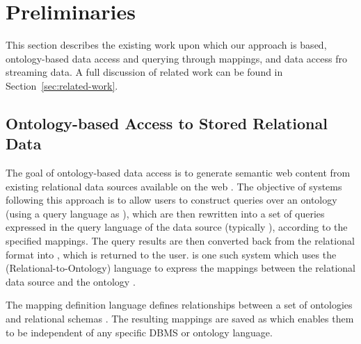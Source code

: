 
\section{Preliminaries}
\label{sec:background}

This section describes the existing work upon which our approach is based, \ie ontology-based data access and querying through mappings, and data access fro streaming data.
A full discussion of related work can be found in Section~\ref{sec:related-work}.


\subsection{Ontology-based Access to Stored Relational Data}
\label{sec:ontol-based-access-stored}

The goal of ontology-based data access is to generate semantic web content from existing relational data sources available on the web \cite{Sahoo_09}.
The objective of systems following this approach is to allow users to construct queries over an ontology (\eg using a query language as \sparql), which are then rewritten into a set of queries expressed in the query language of the data source (typically \sql), according to the specified mappings.
The query results are then converted back from the relational format into \rdf, which is returned to the user.
\odemapster is one such system which uses the \rtwoo (Relational-to-Ontology) language to express the mappings between the relational data source and the ontology \cite{Barrasa_04}.

The mapping definition language \rtwoo defines relationships between a set of ontologies and relational schemas \cite{Barrasa_04}.
The resulting mappings are saved as \xml which enables them to be independent of any specific DBMS or ontology language.

